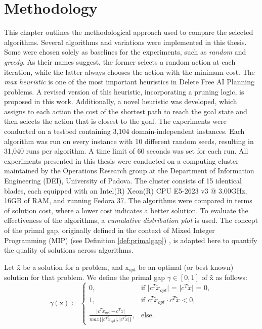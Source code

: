 \chapter{Methodology}
\label{ch:methodology}
This chapter outlines the methodological approach used to compare the selected algorithms.
Several algorithms and variations were implemented in this thesis. Some
were chosen solely as baselines for the experiments, such as \textit{random} and \textit{greedy}.
As their names suggest, the former selects a random action at each iteration, while the latter
always chooses the action with the minimum cost.
The \textit{max heuristic} \cite{bonet2001planning} is one of the most important
heuristics in Delete Free AI Planning problems. A revised version of this heuristic, incorporating
a pruning logic, is proposed in this work.
Additionally, a novel heuristic was developed, which assigns to each action the cost of the shortest path to reach the goal
state and then selects the action that is closest to the goal.
The experiments were conducted on a testbed containing 3,104 domain-independent instances.
Each algorithm was run on every instance with 10 different random seeds, resulting in 31,040 runs
per algorithm. A time limit of 60 seconds was set for each run.
All experiments presented in this thesis were conducted on a computing cluster maintained by the Operations Research group at the
Department of Information Engineering (DEI), University of Padova.
The cluster consists of 15 identical blades, each equipped with an Intel(R) Xeon(R) CPU E5-2623 v3 @ 3.00GHz, 16GB of RAM, and running Fedora 37.
The algorithms were compared in terms of solution cost, where a lower cost indicates a better solution.
To evaluate the effectiveness of the algorithms, a \textit{cumulative distribution plot} is used.
The concept of the primal gap, originally defined in the context of Mixed Integer Programming (MIP)
(see Definition \ref{def:primalgap}) \cite{berthold2013measuring}, is adapted here to quantify the quality of solutions across algorithms.

\begin{definition}
	\label{def:primalgap}
	Let \~x be a solution for a problem, and $\text{\~x}_{opt}$ be an optimal (or best known)
	solution for that problem. We define the primal gap $\gamma \in \left[0, 1\right]$ of \~x as follows:
	\begin{equation*}
		\gamma\left(\text{\~x}\right)\coloneqq\begin{cases}
			0,                                                                                                                            & \text{if $\lvert c^T\tilde{x}_{opt}\rvert$ = $\lvert c^T\tilde{x}\rvert$ = 0}, \\
			1,                                                                                                                            & \text{if $c^T\tilde{x}_{opt} \cdot c^T\tilde{x} < 0$},                         \\
			\frac{\lvert c^T\tilde{x}_{opt} - c^T\tilde{x} \rvert}{max \{\lvert c^T\tilde{x}_{opt} \rvert, \lvert c^T\tilde{x} \rvert\}}, & \text{else}.
		\end{cases}
	\end{equation*}
\end{definition}

